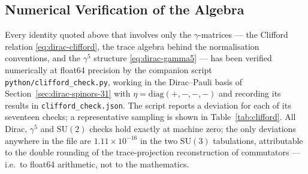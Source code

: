 \subsection{Numerical Verification of the Algebra}
\label{sec:dirac-clifford}

Every identity quoted above that involves only the $\gamma$-matrices ---
the Clifford relation \eqref{eq:dirac-clifford}, the trace algebra behind the
normalisation conventions, and the $\gamma^{5}$ structure
\eqref{eq:dirac-gamma5} --- has been verified numerically at float64
precision by the companion script \texttt{python/clifford\_check.py},
working in the Dirac--Pauli basis of
Section~\ref{sec:dirac-spinors-31} with
$\eta = \mathrm{diag}(+,-,-,-)$ and recording its results in
\texttt{clifford\_check.json}. The script reports a deviation for each of
its seventeen checks; a
representative sampling is shown in Table~\ref{tab:clifford}. All Dirac,
$\gamma^{5}$ and $\mathrm{SU}(2)$ checks hold exactly at machine zero; the
only deviations anywhere in the file are $1.11\times10^{-16}$ in the two
$\mathrm{SU}(3)$ tabulations, attributable to the double rounding of the
trace-projection reconstruction of commutators --- i.e.\ to float64
arithmetic, not to the mathematics.

